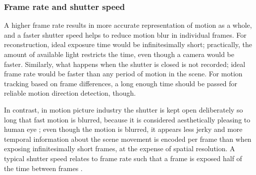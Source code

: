 

\subsubsection{Frame rate and shutter speed} %


A higher frame rate results in more accurate representation of motion as a whole, and a faster shutter speed helps to reduce motion blur in individual frames.
For reconstruction, ideal exposure time would be infinitesimally short; practically, the amount of available light restricts the time, even though a camera would be faster.
Similarly, what happens when the shutter is closed is not recorded; ideal frame rate would be faster than any period of motion in the scene.
For motion tracking based on frame differences, a long enough time should be passed for reliable motion direction detection, though.

In contrast, in motion picture industry the shutter is kept open deliberately so long that fast motion is blurred, because it is considered aesthetically pleasing to human eye \cite{wilson2004anton};
even though the motion is blurred, it appears less jerky and more temporal information about the scene movement is encoded per frame than when exposing infinitesimally short frames, at the expense of spatial resolution.
A typical shutter speed relates to frame rate such that a frame is exposed half of the time between frames \cite{wilson2004anton}.

